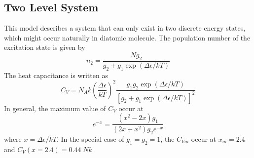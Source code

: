 \documentclass[../../../Main.tex]{subfiles}
\begin{document}
\subsection*{Two Level System}
This model describes a system that can only exist in two discrete energy states, which might occur naturally in diatomic molecule. The population number of the excitation state is given by 
\begin{equation*}
    n_2=\frac{Ng_2}{g_2+g_1\exp(\Delta\epsilon/kT)}
\end{equation*}
The heat capacitance is written as 
\begin{equation*}
    C_V=N_Ak\left(\frac{\Delta\epsilon}{kT}\right)^2\frac{g_1g_2\exp(\Delta\epsilon/kT)}{\left[g_2+g_1\exp(\Delta\epsilon/kT)\right]^2}
\end{equation*}
In general, the maximum value of $C_V$ occur at
\begin{equation*}
   e^{-x}=\frac{(x^2-2x)g_1}{(2x+x^2)g_2e^{-x}} 
\end{equation*}
where $x=\Delta\epsilon/kT$. In the special case of $g_1=g_2=1$, the $C_{Vm}$ occur at $x_m=2.4$ and $C_V(x=2.4)=0.44\;Nk$
\end{document}
